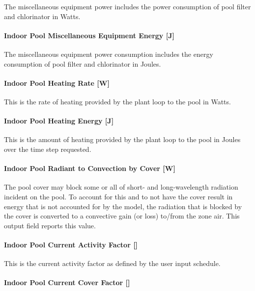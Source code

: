 The miscellaneous equipment power includes the power consumption of pool filter and chlorinator in Watts.

\paragraph{Indoor Pool Miscellaneous Equipment Energy {[}J{]}}\label{indoor-pool-miscellaneous-equipment-energy-j}

The miscellaneous equipment power consumption includes the energy consumption of pool filter and chlorinator in Joules.

\paragraph{Indoor Pool Heating Rate {[}W{]}}\label{indoor-pool-heating-rate-w}

This is the rate of heating provided by the plant loop to the pool in Watts.

\paragraph{Indoor Pool Heating Energy {[}J{]}}\label{indoor-pool-heating-energy-j}

This is the amount of heating provided by the plant loop to the pool in Joules over the time step requested.

\paragraph{Indoor Pool Radiant to Convection by Cover {[}W{]}}\label{indoor-pool-radiant-to-convection-by-cover-w}

The pool cover may block some or all of short- and long-wavelength radiation incident on the pool. To account for this and to not have the cover result in energy that is not accounted for by the model, the radiation that is blocked by the cover is converted to a convective gain (or loss) to/from the zone air. This output field reports this value.

\paragraph{Indoor Pool Current Activity Factor {[]}}\label{indoor-pool-current-activity-factor}

This is the current activity factor as defined by the user input schedule.

\paragraph{Indoor Pool Current Cover Factor {[]}}\label{indoor-pool-current-cover-factor}

